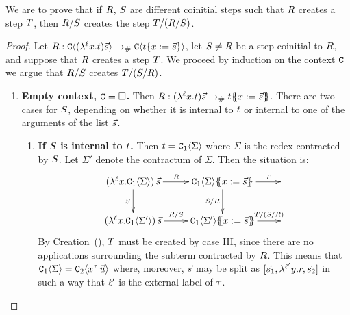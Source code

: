 
We are to prove that if $R$, $S$ are different coinitial steps such
that $R$ creates a step $T$, then $R / S$
creates the step $T / (R / S)$.

\begin{proof}
Let $R : \mathtt{C}\langle(\lambda^{\ell} x. t)\vec{s}\rangle \mathrel{\to_{\mathtt{\#}}} \mathtt{C}\langle t\{x := \vec{s}\}\rangle$,
let $S \neq R$ be a step coinitial to $R$,
and suppose that $R$ creates a step $T$.
We proceed by induction on the context $\mathtt{C}$ we argue that $R/S$ creates $T/(S/R)$.

\begin{enumerate}
\item {\bf Empty context, $\mathtt{C} = \Box$.}
  Then $R : (\lambda^{\ell} x. t)\vec{s} \mathrel{\to_{\mathtt{\#}}} t\{\!\!\{x := \vec{s}\}\!\!\}$.
  There are two cases for $S$, depending on whether it is internal to $t$
  or internal to one of the arguments of the list $\vec{s}$.
  \begin{enumerate}
  \item {\bf If $S$ is internal to $t$.}
    Then $t = \mathtt{C}_1\langle\Sigma\rangle$ where $\Sigma$ is the redex contracted by $S$.
    Let $\Sigma'$ denote the contractum of $\Sigma$.
    Then the situation is:
    \[
      \xymatrix{
        (\lamp{\lab}{\var}{\con_1\of{\Sigma}})\,\ls{\tmtwo}
        \ar[r]^-{\redex}
        \ar[d]_-{\redextwo}
      &
        \con_1\of{\Sigma}\sub{\var}{\ls{\tmtwo}}
        \ar[d]_-{\redextwo/\redex}
        \ar[r]^-{\redexthree}
      &
      \\
        (\lamp{\lab}{\var}{\con_1\of{\Sigma'}})\,\ls{\tmtwo}
        \ar[r]^-{\redex/\redextwo}
      &
        \con_1\of{\Sigma'}\sub{\var}{\ls{\tmtwo}}
        \ar[r]^-{\redexthree/(\redextwo/\redex)}
      &
      }
    \]
    By Creation~(), $T$ must be created by case III,
    since there are no applications surrounding the subterm contracted by $R$.
    This means that $\mathtt{C}_1\langle\Sigma\rangle = \mathtt{C}_2\langle x^{\tau}\,\vec{u}\rangle$
    where, moreover, $\vec{s}$ may be split as $[\vec{s}_1,\lambda^{\ell'} y. r,\vec{s}_2]$
    in such a way that $\ell'$ is the external label of $\tau$.


\end{enumerate}
\end{enumerate}
\end{proof}
